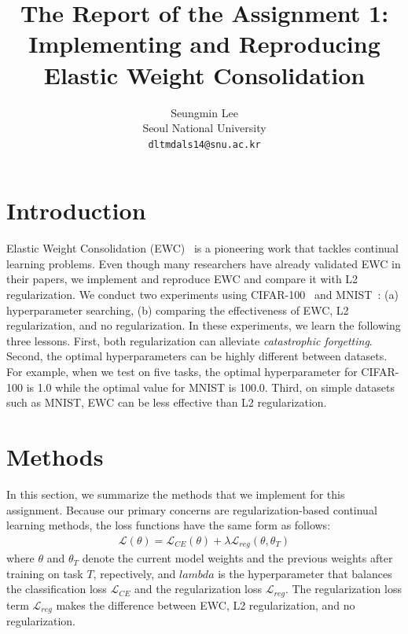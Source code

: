 \documentclass[final]{cvpr}
\begin{document}
\title{The Report of the Assignment 1:\\Implementing and Reproducing Elastic Weight Consolidation}

\author{Seungmin Lee\\
Seoul National University\\
{\tt\small dltmdals14@snu.ac.kr}
}

\onecolumn
\maketitle


\section{Introduction}
Elastic Weight Consolidation (EWC)~\cite{ewc} is a pioneering work that tackles continual learning problems. Even though many researchers have already validated EWC in their papers, we implement and reproduce EWC and compare it with L2 regularization. We conduct two experiments using CIFAR-100~\cite{cifar} and MNIST~\cite{mnist}: (a) hyperparameter searching, (b) comparing the effectiveness of EWC, L2 regularization, and no regularization. In these experiments, we learn the following three lessons. First, both regularization can alleviate \textit{catastrophic forgetting}. Second, the optimal hyperparameters can be highly different between datasets. For example, when we test on five tasks, the optimal hyperparameter for CIFAR-100 is 1.0 while the optimal value for MNIST is 100.0. Third, on simple datasets such as MNIST, EWC can be less effective than L2 regularization. 

\section{Methods}\label{method}
In this section, we summarize the methods that we implement for this assignment. Because our primary concerns are regularization-based continual learning methods, the loss functions have the same form as follows:
\begin{align}
	\mathcal{L}(\theta) = \mathcal{L}_{CE}(\theta) + \lambda\mathcal{L}_{reg}(\theta, \theta_T)
\end{align}
where $\theta$ and $\theta_T$ denote the current model weights and the previous weights after training on task $T$, repectively, and $lambda$ is the hyperparameter that balances the classification loss $\mathcal{L}_{CE}$ and the regularization loss $\mathcal{L}_{reg}$. The regularization loss term $\mathcal{L}_{reg}$ makes the difference between EWC, L2 regularization, and no regularization.
\end{document}
